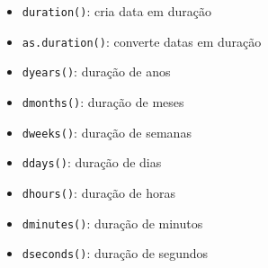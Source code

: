 \documentclass[
]{book}
\providecommand{\tightlist}{%
  \setlength{\itemsep}{0pt}\setlength{\parskip}{0pt}}
\begin{document}
\begin{itemize}
\tightlist
\item
  \texttt{duration()}: cria data em duração
\item
  \texttt{as.duration()}: converte datas em duração
\item
  \texttt{dyears()}: duração de anos
\item
  \texttt{dmonths()}: duração de meses
\item
  \texttt{dweeks()}: duração de semanas
\item
  \texttt{ddays()}: duração de dias
\item
  \texttt{dhours()}: duração de horas
\item
  \texttt{dminutes()}: duração de minutos
\item
  \texttt{dseconds()}: duração de segundos
\end{itemize}
\end{document}
